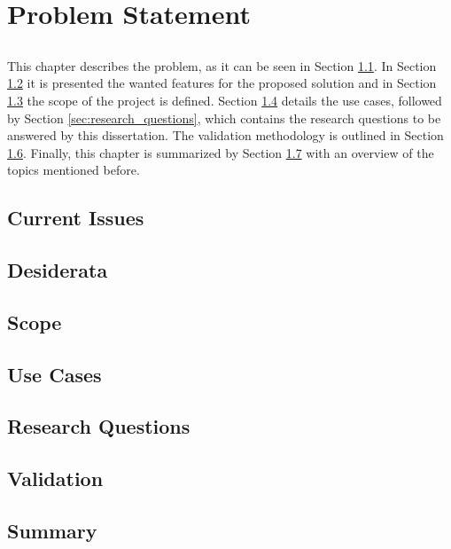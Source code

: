 \chapter{Problem Statement} \label{chap:problem_statement}

\section*{}

This chapter describes the problem, as it can be seen in Section \ref{sec:current_issues}. In Section \ref{sec:disiderata} it is presented the wanted features for the proposed solution and in Section \ref{sec:scope} the scope of the project is defined. Section \ref{sec:use_cases} details the use cases, followed by Section \ref{sec:research_questions}, which contains the research questions to be answered by this dissertation. The validation methodology is outlined in Section \ref{sec:stat_validation}. Finally, this chapter is summarized by Section \ref{sec:stat_summary} with an overview of the topics mentioned before.

\section{Current Issues}\label{sec:current_issues}

\section{Desiderata}\label{sec:disiderata}

\section{Scope}\label{sec:scope}

\section{Use Cases}\label{sec:use_cases}

\section{Research Questions}\label{sec:stat_research_questions}

\section{Validation}\label{sec:stat_validation}

\section{Summary}\label{sec:stat_summary}
